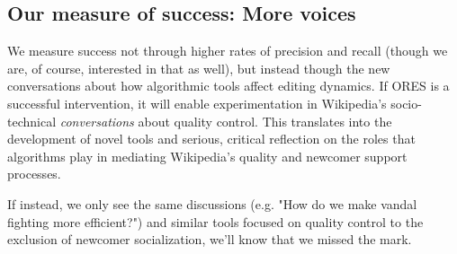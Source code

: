 \subsection{Our measure of success: More voices}
We measure success not through higher rates of precision and recall (though we are, of course, interested in that as well), but instead though the new conversations about how algorithmic tools affect editing dynamics.  If ORES is a successful intervention, it will enable experimentation in Wikipedia's socio-technical \emph{conversations} about quality control.  This translates into the development of novel tools and serious, critical reflection on the roles that algorithms play in mediating Wikipedia's quality and newcomer support processes.

If instead, we only see the same discussions (e.g. "How do we make vandal fighting more efficient?") and similar tools focused on quality control to the exclusion of newcomer socialization, we'll know that we missed the mark.
